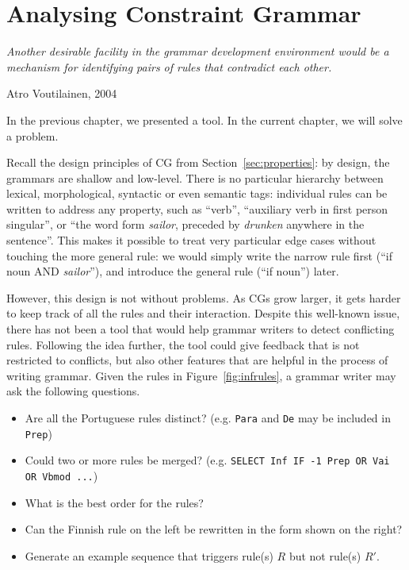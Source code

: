 \def\newcite#1{\cite{#1}}

\def\noun{\textsc{N}}
\def\verb{\textsc{V}}
\def\sg{\textsc{Sg}}
\def\pl{\textsc{Pl}}
\def\detdef{\textsc{DetDef}}


\chapter{Analysing Constraint Grammar}
\label{chapterCGana}

\epigraph{\it Another desirable facility in the grammar development
  environment would be a mechanism for identifying pairs of rules that
  contradict each other.}{Atro Voutilainen, 2004}

In the previous chapter, we presented a tool.
In the current chapter, we will solve a problem.


Recall the design principles of CG from Section~\ref{sec:properties}: 
by design, the grammars are shallow and low-level.
There is no particular hierarchy between lexical, morphological,
syntactic or even semantic tags: individual rules can be written to address any
property, such as ``verb'', ``auxiliary verb in first person singular'',
or ``the word form \emph{sailor}, preceded by \emph{drunken} anywhere in the
sentence''. This makes it possible to treat very particular edge
cases without touching the more general rule: we would simply write
the narrow rule first (``if noun AND \emph{sailor}''), and introduce
the general rule (``if noun'') later.


However, this design is not without problems. As CGs grow larger, it
gets harder to keep track of all the rules and their interaction.
Despite this well-known issue, there has not been a tool that would help 
grammar writers to detect conflicting rules.
Following the idea further, the tool could give feedback that is not 
restricted to conflicts, but also other features that are helpful 
in the process of writing grammar.
Given the rules in Figure~\ref{fig:infrules}, a grammar writer may 
ask the following questions.



\begin{itemize}
\item Are all the Portuguese rules distinct? (e.g. \texttt{Para} and \texttt{De} may be included in \texttt{Prep})
\item Could two or more rules be merged? (e.g. \texttt{SELECT Inf IF -1 Prep OR Vai OR Vbmod ...})
\item What is the best order for the rules?
\item Can the Finnish rule on the left be rewritten in the form shown on the right?
\item Generate an example sequence that triggers rule(s) $R$ but not rule(s) $R'$. 
\end{itemize}

